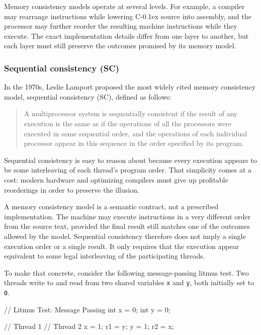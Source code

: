 \documentclass[fontsize=10pt, oneside]{scrartcl}
\newcommand{\monobox}[1]{\mbox{\texttt{#1}}}
\newcommand{\cplusplus}[1]{C\kern-0.1ex\raisebox{0.15ex}{\texttt{++}}#1}
\begin{document}
Memory consistency models operate at several levels.
For example, a compiler may rearrange instructions while lowering \cplusplus{} source into assembly, and the processor may further reorder the resulting machine instructions while they execute.
The exact implementation details differ from one layer to another, but each layer must still preserve the outcomes promised by its memory model.

\subsubsection{Sequential consistency (SC)}

In the 1970s, Leslie Lamport proposed the most widely cited memory consistency model, sequential consistency (SC), defined as follows:

\begin{quote}
A multiprocessor system is sequentially consistent if the result of any execution is the same as if the operations of all the processors were executed in some sequential order, and the operations of each individual processor appear in this sequence in the order specified by its program.
\end{quote}

Sequential consistency is easy to reason about because every execution appears to be some interleaving of each thread's program order.
That simplicity comes at a cost: modern hardware and optimizing compilers must give up profitable reorderings in order to preserve the illusion.

A memory consistency model is a semantic contract, not a prescribed implementation.
The machine may execute instructions in a very different order from the source text, provided the final result still matches one of the outcomes allowed by the model.
Sequential consistency therefore does not imply a single execution order or a single result.
It only requires that the execution appear equivalent to some legal interleaving of the participating threads.

To make that concrete, consider the following message-passing litmus test.
Two threads write to and read from two shared variables \monobox{x} and \monobox{y}, both initially set to \monobox{0}.

\begin{ccode}
// Litmus Test: Message Passing
int x = 0;
int y = 0;

// Thread 1        // Thread 2
x = 1;             r1 = y;
y = 1;             r2 = x;
\end{ccode}
\end{document}
